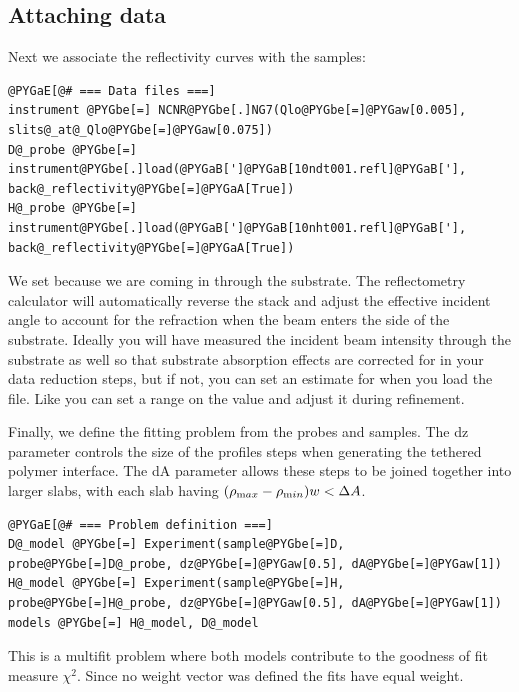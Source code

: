 \documentclass[letterpaper,10pt,english]{sphinxmanual}
\begin{document}
\subsection{Attaching data}
\label{examples/polymer/tethered:attaching-data}
Next we associate the reflectivity curves with the samples:

\begin{Verbatim}[commandchars=@\[\]]
@PYGaE[@# === Data files ===]
instrument @PYGbe[=] NCNR@PYGbe[.]NG7(Qlo@PYGbe[=]@PYGaw[0.005], slits@_at@_Qlo@PYGbe[=]@PYGaw[0.075])
D@_probe @PYGbe[=] instrument@PYGbe[.]load(@PYGaB[']@PYGaB[10ndt001.refl]@PYGaB['], back@_reflectivity@PYGbe[=]@PYGaA[True])
H@_probe @PYGbe[=] instrument@PYGbe[.]load(@PYGaB[']@PYGaB[10nht001.refl]@PYGaB['], back@_reflectivity@PYGbe[=]@PYGaA[True])
\end{Verbatim}

We set  because we are coming in through the
substrate.  The reflectometry calculator will automatically reverse
the stack and adjust the effective incident angle to account for the
refraction when the beam enters the side of the substrate.  Ideally
you will have measured the incident beam intensity through the substrate
as well so that substrate absorption effects are corrected for in your
data reduction steps, but if not, you can set an estimate for
 when you load the file.  Like  you can
set a range on the value and adjust it during refinement.

Finally, we define the fitting problem from the probes and samples.
The dz parameter controls the size of the profiles steps when generating
the tethered polymer interface.  The dA parameter allows these steps
to be joined together into larger slabs, with each slab having
$(\rho_{\text max} - \rho_{\text min}) w < \Delta A$.

\begin{Verbatim}[commandchars=@\[\]]
@PYGaE[@# === Problem definition ===]
D@_model @PYGbe[=] Experiment(sample@PYGbe[=]D, probe@PYGbe[=]D@_probe, dz@PYGbe[=]@PYGaw[0.5], dA@PYGbe[=]@PYGaw[1])
H@_model @PYGbe[=] Experiment(sample@PYGbe[=]H, probe@PYGbe[=]H@_probe, dz@PYGbe[=]@PYGaw[0.5], dA@PYGbe[=]@PYGaw[1])
models @PYGbe[=] H@_model, D@_model
\end{Verbatim}

This is a multifit problem where both models contribute to the goodness
of fit measure $\chi^2$.  Since no weight vector was defined the fits
have equal weight.
\end{document}
